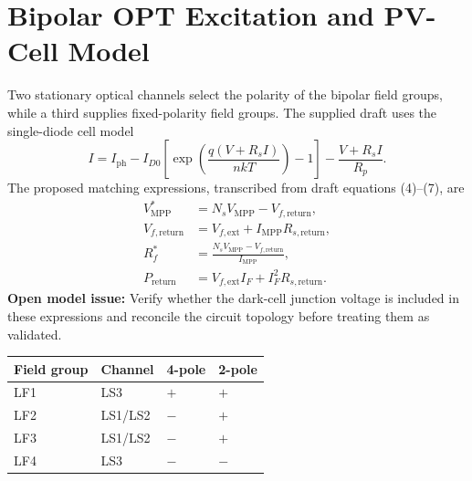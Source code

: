 \section{Bipolar OPT Excitation and PV-Cell Model}
Two stationary optical channels select the polarity of the bipolar field groups, while a third supplies fixed-polarity field groups. The supplied draft uses the single-diode cell model
\begin{equation}
I=I_{\mathrm{ph}}-I_{D0}\left[\exp\left(\frac{q(V+R_sI)}{nkT}\right)-1\right]-\frac{V+R_sI}{R_p}.
\end{equation}
The proposed matching expressions, transcribed from draft equations (4)--(7), are
\begin{align}
V^*_{\mathrm{MPP}} &= N_sV_{\mathrm{MPP}}-V_{f,\mathrm{return}},\\
V_{f,\mathrm{return}} &= V_{f,\mathrm{ext}}+I_{\mathrm{MPP}}R_{s,\mathrm{return}},\\
R_f^* &= \frac{N_sV_{\mathrm{MPP}}-V_{f,\mathrm{return}}}{I_{\mathrm{MPP}}},\\
P_{\mathrm{return}} &= V_{f,\mathrm{ext}}I_F+I_F^2R_{s,\mathrm{return}}.
\end{align}
\textbf{Open model issue:} Verify whether the dark-cell junction voltage is included in these expressions and reconcile the circuit topology before treating them as validated.
\begin{center}
\begin{tabular}{llll}\toprule
Field group & Channel & 4-pole & 2-pole\\\midrule
LF1 & LS3 & $+$ & $+$\\
LF2 & LS1/LS2 & $-$ & $+$\\
LF3 & LS1/LS2 & $-$ & $+$\\
LF4 & LS3 & $-$ & $-$\\\bottomrule
\end{tabular}
\end{center}
